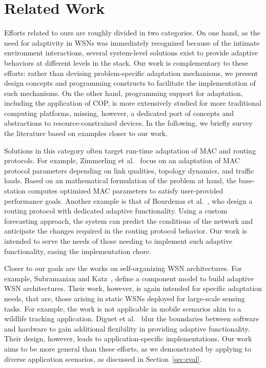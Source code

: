 \section{Related Work}\label{sec:related}

Efforts related to ours are roughly divided in two categories. On one
hand, as the need for adaptivity in WSNs was immediately recognized
because of the intimate environment interactions, several system-level
solutions exist to provide adaptive behaviors at different levels in
the stack. Our work is complementary to these efforts: rather than
devising problem-specific adaptation mechanisms, we present design
concepts and programming constructs to facilitate the implementation
of such mechanisms. On the other hand, programming support for
adaptation, including the application of COP, is more extensively
studied for more traditional computing platforms, missing, however, a
dedicated port of concepts and abstractions to resource-constrained
devices. In the following, we briefly survey the literature based on
examples closer to our work.

 Solutions in this category often
target run-time adaptation of MAC and routing protocols. For example,
Zimmerling et al.~\cite{zimmerling12} focus on an adaptation of MAC
protocol parameters depending on link qualities, topology dynamics,
and traffic loads. Based on an mathematical formulation of the problem
at hand, the base-station computes optimized MAC parameters to satisfy
user-provided performance goals. Another example is that of Bourdenas
et al.~\cite{Bourdenas11}, who design a routing protocol with
dedicated adaptive functionality. Using a custom forecasting approach,
the system can predict the conditions of the network and anticipate
the changes required in the routing protocol behavior. Our work is
intended to serve the needs of those needing to implement such
adaptive functionality, easing the implementation chore.

Closer to our goals are the works on self-organizing WSN
architectures. For example, Subramanian and Katz~\cite{Subramanian00},
define a component model to build adaptive WSN architectures. Their
work, however, is again intended for specific adaptation needs,
that are, those arising in static WSNs deployed for large-scale sensing
tasks. For example, the work is not applicable in mobile scenarios akin to a
wildlife tracking application. Diguet et
al.~\cite{Diguet11} blur the boundaries between software and hardware
to gain additional flexibility in providing adaptive
functionality. Their design, however, leads to application-specific
implementations. Our work aims to be more general than these efforts,
as we demonstrated by applying \conesc to diverse application
scenarios, as discussed in Section~\ref{sec:eval}.

